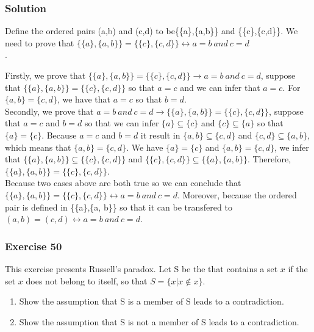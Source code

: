 \documentclass{article}
\theoremstyle{mytheoremstyle}
\theoremstyle{mytheoremstyle}
\theoremstyle{myproblemstyle}
\begin{document}
    \subsubsection*{Solution}
        Define the ordered pairs (a,b) and (c,d) to be\{\{a\},\{a,b\}\} and \{\{c\},\{c,d\}\}. We need to prove that
        \(\{\{a\},\{a,b\}\} = \{\{c\},\{c,d\}\} \leftrightarrow a = b \ and \ c = d\)\\.
        
        Firstly, we prove that \(\{\{a\},\{a,b\}\} = \{\{c\},\{c,d\}\} \to a = b \ and \ c = d\), suppose that \(\{\{a\},\{a,b\}\} = \{\{c\},\{c,d\}\}\) so that \({a} = {c}\) and we can infer that \(a = c\). For \(\{a,b\} = \{c,d\}\), we have that
        \(a = c\) so that \(b = d\).\\

        Secondly, we prove that \(a = b \ and \ c = d \to \{\{a\},\{a,b\}\} = \{\{c\},\{c,d\}\}\), suppose that \(a = c\) and \(b = d\) so that we can infer \(\{a\} \subseteq \{c\}\) and \(\{c\} \subseteq \{a\}\) so that
        \(\{a\} = \{c\}\). Because \(a = c\) and \(b = d\) it result in \(\{a,b\} \subseteq \{c,d\}\) and \(\{c,d\} \subseteq \{a,b\}\), which means that
        \(\{a,b\} = \{c,d\}\). We have \(\{a\} = \{c\}\) and \(\{a,b\} = \{c,d\}\), we infer that \(\{\{a\},\{a,b\}\} \subseteq \{\{c\},\{c,d\}\}\)
        and \(\{\{c\},\{c,d\}\} \subseteq \{\{a\},\{a,b\}\}\). Therefore, \(\{\{a\},\{a,b\}\} = \{\{c\},\{c,d\}\}\).\\

        Because two cases above are both true so we can conclude that \(\{\{a\},\{a,b\}\} = \{\{c\},\{c,d\}\} \leftrightarrow a = b \ and \ c = d\). Moreover, because the ordered
        pair is defined in \{\{a\},\{a, b\}\} so that it can be transfered to \((a,b) = (c,d) \leftrightarrow a = b \ and \ c = d\).
    \subsubsection*{Exercise 50}
        This exercise presents Russell's paradox. Let S be the that contains a set \(x\) if the set \(x\) does not belong to itself, so that \(S = \{x | x \notin x\}\).
        \begin{enumerate} [label = (\alph*)]
            \item Show the assumption that S is a member of S leads to a contradiction.
            \item Show the assumption that S is not a member of S leads to a contradiction.
        \end{enumerate}
\end{document}
